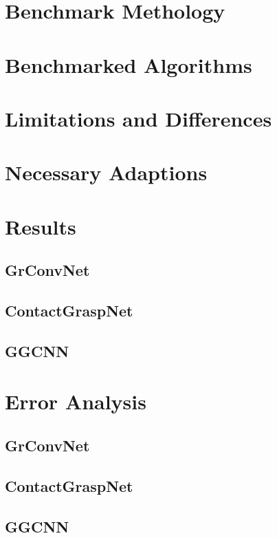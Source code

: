 \documentclass[conference]{IEEEtran}
\begin{document}
\section{Benchmark Methology}


\section{Benchmarked Algorithms}


\section{Limitations and Differences}



\section{Necessary Adaptions}


\section{Results}
\subsection{GrConvNet}
\subsection{ContactGraspNet}
\subsection{GGCNN}

\section{Error Analysis}
\subsection{GrConvNet}
\subsection{ContactGraspNet}
\subsection{GGCNN}
\end{document}

